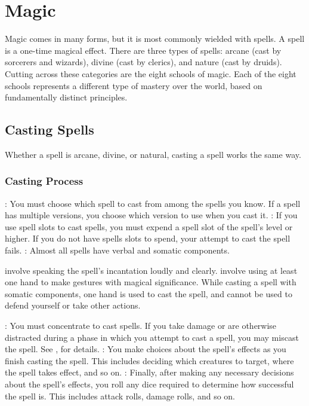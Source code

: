 \chapter{Magic}

Magic comes in many forms, but it is most commonly wielded with spells. A spell is a one-time magical effect. There are three types of spells: arcane (cast by sorcerers and wizards), divine (cast by clerics), and nature (cast by druids). Cutting across these categories are the eight schools of magic. Each of the eight schools represents a different type of mastery over the world, based on fundamentally distinct principles.

\section{Casting Spells}\label{Casting Spells}
Whether a spell is arcane, divine, or natural, casting a spell works the same way.

\subsection{Casting Process}

\begin{itemize}
    : You must choose which spell to cast from among the spells you know. If a spell has multiple versions, you choose which version to use when you cast it.
    : If you use spell slots to cast spells, you must expend a spell slot of the spell's level or higher. If you do not have spells slots to spend, your attempt to cast the spell fails.
    : Almost all spells have verbal and somatic components.
        \begin{itemize}
            \label{Verbal Components} involve speaking the spell's incantation loudly and clearly.
            \label{Somatic Components} involve using at least one hand to make gestures with magical significance. While casting a spell with somatic components, one hand is used to cast the spell, and cannot be used to defend yourself or take other actions.
        \end{itemize}
    : You must concentrate to cast spells. If you take damage or are otherwise distracted during a phase in which you attempt to cast a spell, you may miscast the spell. See , for details.
    : You make choices about the spell's effects as you finish casting the spell. This includes deciding which creatures to target, where the spell takes effect, and so on.
    : Finally, after making any necessary decisions about the spell's effects, you roll any dice required to determine how successful the spell is. This includes attack rolls, damage rolls, and so on.
\end{itemize}

